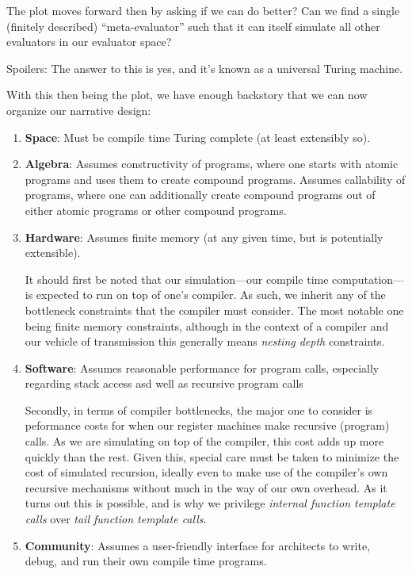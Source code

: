 \documentclass[twoside]{article}
\newcommand{\strong}[1]{{\bfseries #1}}
\begin{document}
The plot moves forward then by asking if we can do better? Can we find a single (finitely described)
``meta-evaluator'' such that it can itself simulate all other evaluators in our evaluator space?

Spoilers: The answer to this is yes, and it's known as a universal Turing machine.

With this then being the plot, we have enough backstory that we can now organize our narrative design:

\begin{enumerate}

\item \strong{Space}: Must be compile time Turing complete (at least extensibly so).

\item \strong{Algebra}: Assumes constructivity of programs, where one starts with atomic programs and uses them to create
compound programs. Assumes callability of programs, where one can additionally create compound programs out of either
atomic programs or other compound programs.

\item \strong{Hardware}: Assumes finite memory (at any given time, but is potentially extensible).

It should first be noted that our simulation---our compile time computation---is expected to run on top
of one's compiler. As such, we inherit any of the bottleneck constraints that the compiler must consider.
The most notable one being finite memory constraints, although in the context of a compiler and our vehicle
of transmission this generally means \emph{nesting depth} constraints.

\item \strong{Software}: Assumes reasonable performance for program calls, especially regarding stack access
asd well as recursive program calls

Secondly, in terms of compiler bottlenecks, the major one to consider is peformance costs for when our register machines
make recursive (program) calls. As we are simulating on top of the compiler, this cost adds up more quickly than the
rest. Given this, special care must be taken to minimize the cost of simulated recursion, ideally even to make use
of the compiler's own recursive mechanisms without much in the way of our own overhead. As it turns out this is possible,
and is why we privilege \emph{internal function template calls} over \emph{tail function template calls}.

\item \strong{Community}: Assumes a user-friendly interface for architects to write, debug, and run their own
compile time programs.


\end{enumerate}
\end{document}
